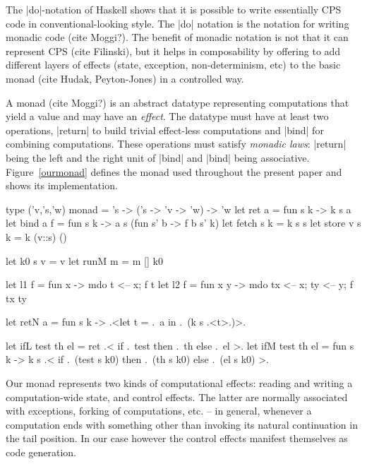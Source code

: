 \documentclass{llncs}
\begin{document}
The |do|-notation of Haskell \cite{Haskell98Report} shows that it is possible
to write essentially CPS code in conventional-looking style. The
|do| notation is the notation for writing monadic code (cite Moggi?).
The benefit of monadic notation is not that it can represent CPS (cite
Filinski), but it helps in composability by offering to add different
layers of effects (state, exception, non-determinism, etc) to the
basic monad (cite Hudak, Peyton-Jones) in a controlled way.

A monad (cite Moggi?) is an abstract datatype representing
computations that yield a value and may have an \emph{effect}.
The datatype must have at least two operations, |return| to build
trivial effect-less computations and |bind| for combining
computations. These operations must satisfy \emph{monadic laws}:
|return| being the left and the right unit of |bind| and |bind| being
associative. Figure~\ref{ourmonad} defines the monad used throughout
the present paper and shows its implementation.

\begin{figure*}\label{ourmonad}
\begin{code}
type ('v,'s,'w) monad = 's -> ('s -> 'v -> 'w) -> 'w
let ret a = fun s k -> k s a
let bind a f = fun s k -> a s (fun s' b -> f b s' k)
let fetch s k = k s s
let store v s k = k (v::s) ()

let k0 s v = v
let runM m = m [] k0

let l1 f = fun x -> mdo { t <-- x; f t}
let l2 f = fun x y -> mdo { tx <-- x; ty <-- y; f tx ty}

let retN a = fun s k -> .<let t = .~a in .~(k s .<t>.)>.

let ifL test th el = ret .< if .~test then .~th else .~el >.
let ifM test th el = fun s k ->
  k s .< if .~(test s k0) then .~(th s k0) else .~(el s k0) >.
\end{code}
\caption{Our monad}
\end{figure*}

Our monad represents two kinds of computational effects: reading and
writing a computation-wide state, and control effects. The latter are
normally associated with exceptions, forking of computations, etc. --
in general, whenever a computation ends with something other than
invoking its natural continuation in the tail position. In our case
however the control effects manifest themselves as code generation.
\end{document}
